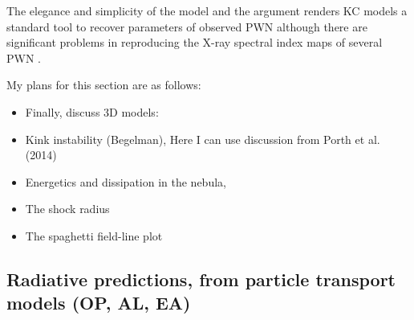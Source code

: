 The elegance and simplicity of the \cite{1984ApJ...283..694K} model and the \cite{1974MNRAS.167....1R} argument renders KC models a standard tool to recover parameters of observed PWN \citep[e.g.][]{sefakodeJager2003,PetreHwang2007} although there are significant problems in reproducing the X-ray spectral index maps of several PWN \citep{reynolds2003,tang2012,NynkaHailey2014,PorthVorster2016}.  


My plans for this section are as follows:
\begin{itemize}
\item
Finally, discuss 3D models:
\item
Kink instability (Begelman), Here I can use discussion from Porth et al. (2014)
\item
Energetics and dissipation in the nebula, 
\item
The shock radius
\item
The spaghetti field-line plot
\end{itemize}




\subsection{Radiative predictions, from particle transport models      (OP, AL, EA)}
